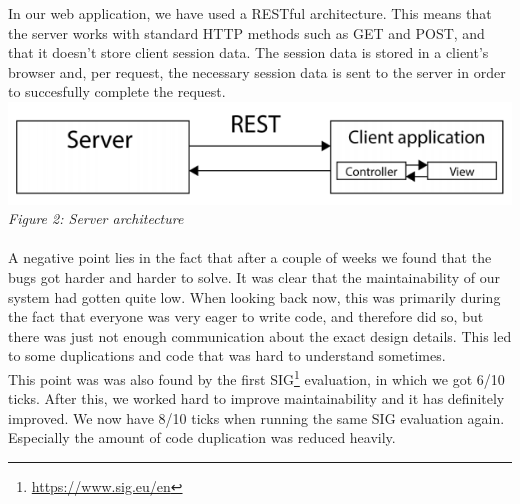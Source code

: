 In our web application, we have used a RESTful architecture. This means that the server works with standard HTTP methods such as GET and POST, and that it doesn't store client session data. The session data is stored in a client's browser and, per request, the necessary session data is sent to the server in order to succesfully complete the request.\\
\includegraphics[scale=1]{./images/rest}\\
\textit{Figure 2: Server architecture}\\\\
A negative point lies in the fact that after a couple of weeks we found that the bugs got harder and harder to solve. It was clear that the maintainability of our system had gotten quite low. When looking back now, this was primarily during the fact that everyone was very eager to write code, and therefore did so, but there was just not enough communication about the exact design details. This led to some duplications and code that was hard to understand sometimes.\\
This point was was also found by the first SIG\footnote{\url{https://www.sig.eu/en}} evaluation, in which we got 6/10 ticks. After this, we worked hard to improve maintainability and it has definitely improved. We now have 8/10 ticks when running the same SIG evaluation again. Especially the amount of code duplication was reduced heavily.\\


